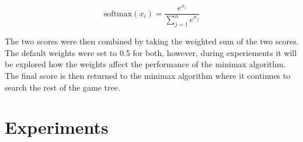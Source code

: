 \begin{equation}
    \label{eq:softmax}
    \text{softmax}(x_i) = \frac{e^{x_i}}{\sum_{j=1}^{n} e^{x_j}}
\end{equation}


The two scores were then combined by taking the weighted sum of the two scores. The default weights were set to 0.5 for both, however, during experiements it will be explored how the weights affect the performance of the minimax algorithm. The final score is then returned to the minimax algorithm where it continues to search the rest of the game tree.


\section{Experiments}






